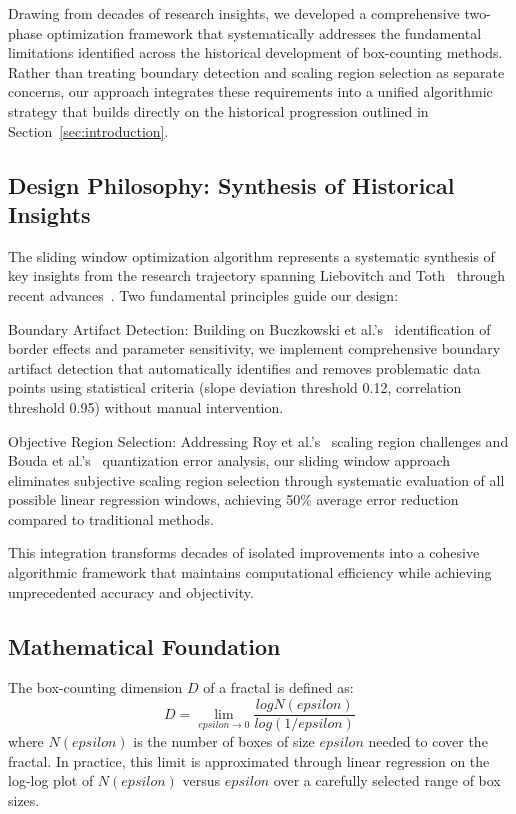 \documentclass[preprint,12pt]{elsarticle}
\def\textbf#1{#1}%
\def\log{log}%
\def\epsilon{epsilon}%
\begin{document}
Drawing from decades of research insights, we developed a comprehensive two-phase optimization framework that systematically addresses the fundamental limitations identified across the historical development of box-counting methods. Rather than treating boundary detection and scaling region selection as separate concerns, our approach integrates these requirements into a unified algorithmic strategy that builds directly on the historical progression outlined in Section~\ref{sec:introduction}.

\subsection{Design Philosophy: Synthesis of Historical Insights}

The sliding window optimization algorithm represents a systematic synthesis of key insights from the research trajectory spanning Liebovitch and Toth~\cite{liebovitch1989} through recent advances~\cite{bouda2016,wu2020}. Two fundamental principles guide our design:

\textbf{Boundary Artifact Detection}: Building on Buczkowski et al.'s~\cite{buczkowski1998} identification of border effects and parameter sensitivity, we implement comprehensive boundary artifact detection that automatically identifies and removes problematic data points using statistical criteria (slope deviation threshold 0.12, correlation threshold 0.95) without manual intervention.

\textbf{Objective Region Selection}: Addressing Roy et al.'s~\cite{roy2007} scaling region challenges and Bouda et al.'s~\cite{bouda2016} quantization error analysis, our sliding window approach eliminates subjective scaling region selection through systematic evaluation of all possible linear regression windows, achieving 50\% average error reduction compared to traditional methods.

This integration transforms decades of isolated improvements into a cohesive algorithmic framework that maintains computational efficiency while achieving unprecedented accuracy and objectivity.

\subsection{Mathematical Foundation}

The box-counting dimension $D$ of a fractal is defined as:
\begin{equation}
D = \lim_{\epsilon \to 0} \frac{\log N(\epsilon)}{\log(1/\epsilon)}
\label{eq:box_counting_def}
\end{equation}
where $N(\epsilon)$ is the number of boxes of size $\epsilon$ needed to cover the fractal. In practice, this limit is approximated through linear regression on the log-log plot of $N(\epsilon)$ versus $\epsilon$ over a carefully selected range of box sizes.
\end{document}
